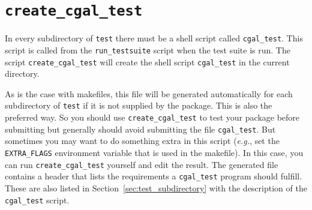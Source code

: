 \section{{\tt create\_cgal\_test}}
\label{sec:create_cgal_test}

In every subdirectory of {\tt test} there must be a shell script called
{\tt cgal\_test}. This script is called from the {\tt run\_testsuite}%
script when the test suite is run. The script
{{\tt create\_cgal\_test}}
will create the shell script {\tt cgal\_test} in the current directory.

As is the case with makefiles, this file will be generated automatically for
each subdirectory of {\tt test} if
it is not supplied by the package. This is also the preferred way.
So you should use {\tt create\_cgal\_test} to test your package before
submitting but generally should avoid submitting the file {\tt cgal\_test}.
But sometimes you may want to do something extra in this script ({\em e.g.}, set
the {\tt EXTRA\_FLAGS}
environment variable that is used in the makefile).
In this case, you can run {\tt create\_cgal\_test} yourself and edit the result.
The generated file contains a header that lists the requirements a
{\tt cgal\_test} program should fulfill. These are also listed in
Section~\ref{sec:test_subdirectory} with the description of the
{\tt cgal\_test} script.


